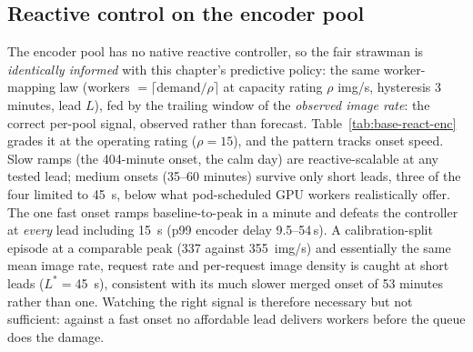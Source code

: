 \subsection{Reactive control on the encoder pool}
\label{sec:base-reactive-enc}

The encoder pool has no native reactive controller, so the fair strawman is
\emph{identically informed} with this chapter's predictive policy: the same
worker-mapping law (workers $= \lceil \text{demand} / \rho \rceil$ at capacity
rating $\rho$ \si{img/s}, hysteresis 3 minutes, lead $L$), fed by the trailing
window of the \emph{observed image rate}: the correct per-pool signal,
observed rather than forecast. Table~\ref{tab:base-react-enc} grades it at the
operating rating ($\rho{=}15$), and the pattern tracks onset speed. Slow ramps
(the 404-minute onset, the calm day) are reactive-scalable at any tested lead;
medium onsets (35--60 minutes) survive only short leads, three of the four
limited to \SI{45}{\second}, below what pod-scheduled GPU workers realistically
offer. The one fast onset ramps baseline-to-peak in a minute and defeats the
controller at \emph{every} lead including \SI{15}{\second} (p99 encoder delay
9.5--54\,\si{\second}). A calibration-split episode at a comparable peak
(\SI{337}{} against \SI{355}{img/s}) and essentially the same mean image rate,
request rate and per-request image density is caught at short leads
($L^{*}{=}$\SI{45}{\second}), consistent with its much slower merged onset of
53 minutes rather than one. Watching the right signal is therefore necessary but
not sufficient: against a fast onset no affordable lead delivers workers before
the queue does the damage.


